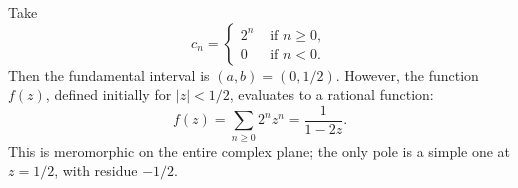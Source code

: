 \documentclass[reqno]{amsart}  \numberwithin{theorem}{section} \numberwithin{equation}{section}
\begin{document}
\begin{example}
  Take
  \begin{equation*}
    c_n =
    \begin{cases}
      2^n & \text{ if } n \geq 0, \\
      0 & \text{ if } n < 0.
    \end{cases}
  \end{equation*}
  Then the fundamental interval is $(a, b) = (0, 1/2)$.  However, the function $f(z)$, defined initially for $\lvert z \rvert < 1/2$, evaluates to a rational function:
  \begin{equation*}
    f(z) = \sum_{n \geq 0} 2^n z^n
    = \frac{1}{1 - 2 z}.
  \end{equation*}
  This is meromorphic on the entire complex plane; the only pole is a simple one at $z = 1/2$, with residue $-1/2$.
\end{example}
\end{document}
